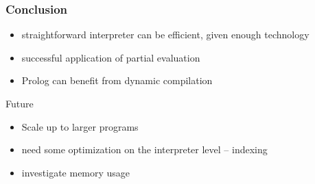 \documentclass[utf8x]{beamer}
\begin{document}
\begin{frame}
  \frametitle{Conclusion}
  \begin{itemize}
      \item straightforward interpreter can be efficient, given enough technology
      \item successful application of partial evaluation
      \item Prolog can benefit from dynamic compilation
  \end{itemize}
  \pause
  \begin{block}{Future}
      \begin{itemize}
          \item Scale up to larger programs
          \item need some optimization on the interpreter level – indexing
          \item investigate memory usage
      \end{itemize}
  \end{block}
\end{frame}
\end{document}
